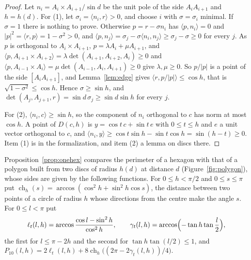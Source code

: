 \documentclass[12pt]{amsart}
\theoremstyle{definition}
\theoremstyle{plain}
\theoremstyle{definition}
\begin{document}
\begin{proof}
Let $n_i=A_i\times A_{i+1}/\sin d$ be the unit pole of the side $A_iA_{i+1}$ and $h=h(d)$. For (1), let $\sigma_i=\langle n_i,r\rangle>0$, and choose $i$ with $\sigma=\sigma_i$ minimal. If $\sigma=1$ there is nothing to prove. Otherwise $p=r-\sigma n_i$ has $\langle p,n_i\rangle=0$ and $|p|^2=\langle r,p\rangle=1-\sigma^2>0$, and $\langle p,n_j\rangle=\sigma_j-\sigma\langle n_i,n_j\rangle\ge\sigma_j-\sigma\ge0$ for every $j$. As $p$ is orthogonal to $A_i\times A_{i+1}$, $p=\lambda A_i+\mu A_{i+1}$, and $\langle p,A_{i+1}\times A_{i+2}\rangle=\lambda\det(A_{i+1},A_{i+2},A_i)\ge0$ and $\langle p,A_{i-1}\times A_i\rangle=\mu\det(A_{i-1},A_i,A_{i+1})\ge0$ give $\lambda,\mu\ge0$. So $p/|p|$ is a point of the side $[A_iA_{i+1}]$, and Lemma~\ref{lem:edge} gives $\langle r,p/|p|\rangle\le\cos h$, that is $\sqrt{1-\sigma^2}\le\cos h$. Hence $\sigma\ge\sin h$, and $\det(A_j,A_{j+1},r)=\sin d\,\sigma_j\ge\sin d\sin h$ for every $j$.

For (2), $\langle n_i,c\rangle\ge\sin h$, so the component of $n_i$ orthogonal to $c$ has norm at most $\cos h$. A point of $D(c,h)$ is $y=\cos t\,c+\sin t\,e$ with $0\le t\le h$ and $e$ a unit vector orthogonal to $c$, and $\langle n_i,y\rangle\ge\cos t\sin h-\sin t\cos h=\sin(h-t)\ge0$. Item (1) is  in the formalization, and item (2) a lemma on discs there.
\end{proof}

Proposition~\ref{prop:onehex} compares the perimeter of a hexagon with that of a polygon built from two discs of radius $h(d)$ at distance $d$ (Figure~\ref{fig:polygon}), whose sides are given by the following functions. For $0\le h<\pi/2$ and $0\le s\le\pi$ put $\operatorname{ch}_h(s)=\arccos(\cos^2h+\sin^2h\cos s)$, the distance between two points of a circle of radius $h$ whose directions from the centre make the angle $s$. For $0\le l<\pi$ put
\[
\ell_t(l,h)=\arccos\frac{\cos l-\sin^2h}{\cos^2h},\qquad\gamma_t(l,h)=\arccos\Bigl(-\tan h\tan\frac l2\Bigr),
\]
the first for $l\le\pi-2h$ and the second for $\tan h\tan(l/2)\le1$, and $P_{10}(l,h)=2\ell_t(l,h)+8\operatorname{ch}_h\bigl((2\pi-2\gamma_t(l,h))/4\bigr)$.
\end{document}
